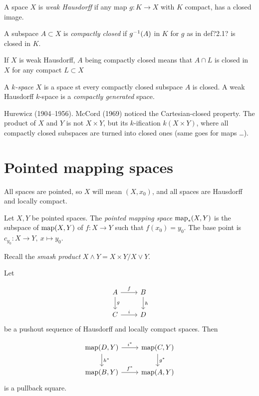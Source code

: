 \documentclass[main.tex]{subfiles}
\begin{document}
\begin{defn}
	A space \(X\) is \emph{weak Hausdorff} if any map \(g: K \to X\) with \(K\) compact, has a closed image.
\end{defn}

\begin{defn}
	A subspace \(A \subset X\) is \emph{compactly closed} if \(g^{-1}(A)\) in \(K\) for \(g\) as in def?2.1? is closed in \(K\).
\end{defn}

If \(X\) is weak Hausdorff, \(A\) being compactly closed means that \(A \cap L\) is closed in \(X\) for any compact \(L \subset X\)

\begin{defn}
	A \emph{\(k\)-space} \(X\) is a space st every compactly closed subspace \(A\) is closed. A weak Hausdorff \(k\)-space is a \emph{compactly generated} space.
\end{defn}
Hurewicz (1904--1956).
McCord (1969) noticed the Cartesian-closed property.
The product of \(X\) and \(Y\) is not \(X \times Y\), but its \(k\)-ification \(k(X \times Y)\), where all compactly closed subspaces are turned into closed ones (same goes for maps \ldots).

\section{Pointed mapping spaces}

All spaces are pointed, so \(X\) will mean \((X, x_0)\), and all spaces are Hausdorff and locally compact.

\begin{defn}
	Let \(X,Y\) be pointed spaces. The \emph{pointed mapping space} \(\operatorname{map}_*(X,Y)\) is the subspace of \(\operatorname{map}(X,Y)\) of \(f: X \to Y\) such that \(f(x_0) = y_0\). The base point is \(c_{y_0}: X \to Y, \ x \mapsto y_0\).
\end{defn}

Recall the \emph{smash product} \(X \wedge Y = X \times Y / X \vee Y\).

\begin{lemma}
	Let

\[

\begin{tikzcd}
			A \ar{r}{f} \ar{d}{g} & B \ar{d}{h} \\
			C \ar{r}{i} & D

\end{tikzcd}

\]
	be a pushout sequence of Hausdorff and locally compact spaces.
	Then

\[

\begin{tikzcd}
			\map(D,Y) \ar{r}{i^*} \ar{d}{h^*} & \map(C,Y) \ar{d}{g^*} \\
			\map(B,Y) \ar{r}{f^*} & \map(A,Y)

\end{tikzcd}

\]
	is a pullback square.
\end{lemma}
\end{document}

